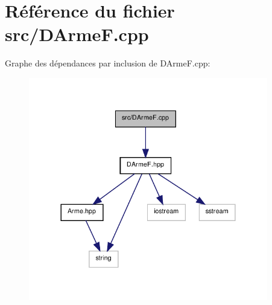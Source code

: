 \section{Référence du fichier src/\-D\-Arme\-F.cpp}
\label{_d_arme_f_8cpp}
Graphe des dépendances par inclusion de D\-Arme\-F.\-cpp\-:\nopagebreak
\begin{figure}[H]
\begin{center}
\leavevmode
\includegraphics[width=296pt]{_d_arme_f_8cpp__incl}
\end{center}
\end{figure}
